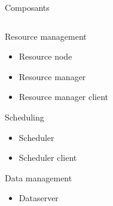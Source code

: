 \documentclass{beamer}
\begin{document}
\begin{frame}{Composants}
\begin{columns}
\begin{column}[r]{0.5\linewidth}
        \begin{block}{Resource management}
            \begin{itemize}
                \item Resource node
                \item Resource manager
                \item Resource manager client
            \end{itemize}
        \end{block}
        \begin{alertblock}{Scheduling}
            \begin{itemize}
                \item Scheduler
                \item Scheduler client
            \end{itemize}
        \end{alertblock}
        \begin{exampleblock}{Data management}
            \begin{itemize}
                \item Dataserver
            \end{itemize}
        \end{exampleblock}
        
	\end{column}
	\end{columns}
\end{frame}
\end{document}
